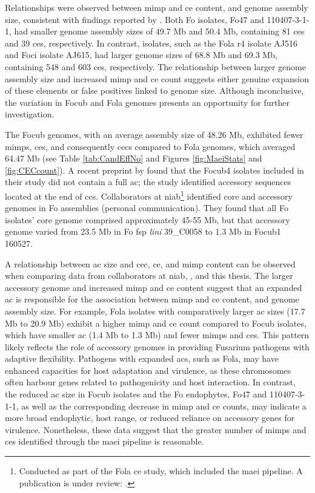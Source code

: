 Relationships were observed between \ac{mimp} and \ac{ce} content, and genome assembly size, consistent with findings reported by \textcite{Dam2016, FoEC2}. Both \ac{Fo} isolates, Fo47 and 110407-3-1-1, had smaller genome assembly sizes of 49.7 Mb and 50.4 Mb, containing 81 \acp{ce} and 39 \acp{ce}, respectively. In contrast, isolates, such as the \ac{Fola} \ac{r4} isolate AJ516 and \ac{Foci} isolate AJ615, had larger genome sizes of 68.8 Mb and 69.3 Mb, containing 548 and 603 \acp{ce}, respectively. The relationship between larger genome assembly size and increased \ac{mimp} and \ac{ce} count suggests either genuine expansion of these elements or false positives linked to genome size. Although inconclusive, the variation in \ac{Focub} and \ac{Fola} genomes presents an opportunity for further investigation.

The \ac{Focub} genomes, with an average assembly size of 48.26 Mb, exhibited fewer \acp{mimp}, \acp{ce}, and consequently \acp{cec}  compared to \ac{Fola} genomes, which averaged 64.47 Mb (see Table \ref{tab:CandEffNo} and Figures \ref{fig:MaeiStats} and \ref{fig:CECcount}). A recent preprint by \textcite{Ma2023} found that the \ac{Focub4} isolates included in their study did not contain a full \acf{ac}; the study identified accessory sequences located at the end of \acfp{cc}. Collaborators at \ac{niab}\footnote{Conducted as part of the \acl{Fola} \ac{ce} study, which included the \ac{maei} pipeline. A publication is under review: \textcite{FolaManuscript}.} identified core and accessory genomes in \ac{Fo} assemblies (personal communication). They found that all \ac{Fo} isolates' core genome comprised approximately 45-55 Mb, but that accessory genome varied from 23.5 Mb in \ac{Fo} \ac{fsp} \textit{lini} 39\_C0058 to 1.3 Mb in \ac{Focub1} 160527. 

A relationship between \ac{ac} size and \ac{cec}, \ac{ce}, and \ac{mimp} content can be observed when comparing data from collaborators at \ac{niab}, \textcite{Ma2023}, and this thesis. The larger accessory genome and increased \ac{mimp} and \ac{ce} content suggest that an expanded \ac{ac} is responsible for the association between \ac{mimp} and \ac{ce} content, and genome assembly size. For example, \ac{Fola} isolates with comparatively larger \ac{ac} sizes (17.7 Mb to 20.9 Mb) exhibit a higher \ac{mimp} and \ac{ce} count compared to \ac{Focub} isolates, which have smaller \ac{ac} (1.4 Mb to 1.3 Mb) and fewer \acp{mimp} and \acp{ce}. This pattern likely reflects the role of accessory genomes in providing Fusarium pathogens with adaptive flexibility. Pathogens with expanded \acp{ac}, such as \ac{Fola}, may have enhanced capacities for host adaptation and virulence, as these chromosomes often harbour genes related to pathogenicity and host interaction. In contrast, the reduced \ac{ac} size in \ac{Focub} isolates and the \ac{Fo} endophytes, Fo47 and 110407-3-1-1, as well as the corresponding decrease in \ac{mimp} and \ac{ce} counts, may indicate a more broad endophytic, host range, or reduced reliance on accessory genes for virulence. Nonetheless, these data suggest that the greater number of \acp{mimp} and \acp{ce} identified through the \ac{maei} pipeline is reasonable. 

